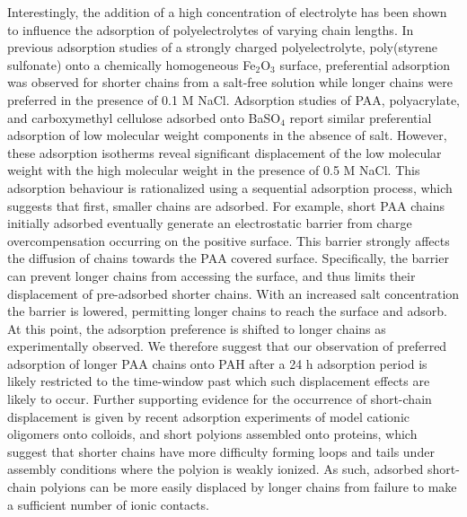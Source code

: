 \documentclass[twoside,twocolumn,9pt]{article}
\begin{document}
Interestingly, the addition of a high concentration of electrolyte has been shown to influence the adsorption of polyelectrolytes of varying chain lengths.  In previous adsorption studies of a strongly charged polyelectrolyte, poly(styrene sulfonate) onto a chemically homogeneous Fe$_2$O$_3$ surface, preferential adsorption was observed for shorter chains from a salt-free solution while longer chains were preferred in the presence of 0.1 M NaCl.\cite{Ramachandran1987,Ramachandran1988}  Adsorption studies of PAA,\cite{Wright1987} polyacrylate,\cite{Bain1982} and carboxymethyl cellulose\cite{Bain1982} adsorbed onto BaSO$_4$ report similar preferential adsorption of low molecular weight components in the absence of salt.  However, these adsorption isotherms reveal significant displacement of the low molecular weight with the high molecular weight in the presence of 0.5 M NaCl.\cite{Bain1982} This adsorption behaviour is rationalized using a sequential adsorption process, which suggests that first, smaller chains are adsorbed.\cite{DeLaat1995}  For example, short PAA chains initially adsorbed eventually generate an electrostatic barrier from charge overcompensation occurring on the positive surface.  This barrier strongly affects the diffusion of chains towards the PAA covered surface.  Specifically, the barrier can prevent longer chains from accessing the surface, and thus limits their displacement of pre-adsorbed shorter chains.  With an increased salt concentration the barrier is lowered, permitting longer chains to reach the surface and adsorb.  At this point, the adsorption preference is shifted to longer chains as experimentally observed.\cite{DeLaat1995}  We therefore suggest that our observation of preferred adsorption of longer PAA chains onto PAH after a 24 h adsorption period is likely restricted to the time-window past which such displacement effects are likely to occur.  Further supporting evidence for the occurrence of short-chain displacement is given by recent adsorption experiments of model cationic oligomers onto colloids,\cite{Shin2001} and short polyions assembled onto proteins,\cite{Houska2004} which suggest that shorter chains have more difficulty forming loops and tails under assembly conditions where the polyion is weakly ionized.  As such, adsorbed short-chain polyions can be more easily displaced by longer chains from failure to make a sufficient number of ionic contacts.  

\end{document}
